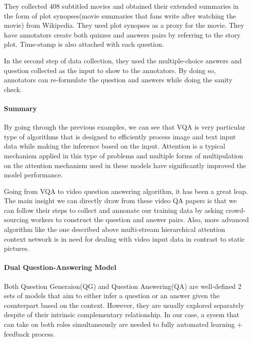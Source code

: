 \documentclass[]{book}
\let\oldparagraph\paragraph
\renewcommand{\paragraph}[1]{\oldparagraph{#1}\mbox{}}
\theoremstyle{definition}
\theoremstyle{definition}
\theoremstyle{definition}
\theoremstyle{remark}
\begin{document}
They collected 408 subtitled movies and obtained their extended
summaries in the form of plot synopses(movie summaries that fans write
after watching the movie) from Wikipedia. They used plot synopses as a
proxy for the movie. They have annotators create both quizzes and
answers pairs by referring to the story plot. Time-stamp is also
attached with each question.

In the second step of data collection, they used the multiple-choice
answers and question collected as the input to show to the annotators.
By doing so, annotators can re-formulate the question and answers while
doing the sanity check.

\paragraph{Summary}\label{summary-1}

By going through the previous examples, we can see that VQA is very
particular type of algorithms that is designed to efficiently process
image and text input data while making the inference based on the input.
Attention is a typical mechanism applied in this type of problems and
multiple forms of multipulation on the attention mechanism used in these
models have significantly improved the model performance.

Going from VQA to video question answering algorithm, it has been a
great leap. The main insight we can directly draw from these video QA
papers is that we can follow their steps to collect and annonate our
training data by asking crowd-sourcing workers to construct the question
and answer pairs. Also, more advanced algorithm like the one described
above multi-stream hierarchical attention context network is in need for
dealing with video input data in contrast to static pictures.

\paragraph{Dual Question-Answering
Model}\label{dual-question-answering-model}

Both Question Generaion(QG) and Question Answering(QA) are well-defined
2 sets of models that aim to either infer a question or an answer given
the counterpart based on the context. However, they are usually explored
separately despite of their intrinsic complementary relationship. In our
case, a sysem that can take on both roles simultaneously are needed to
fully automated learning + feedback process.
\end{document}

